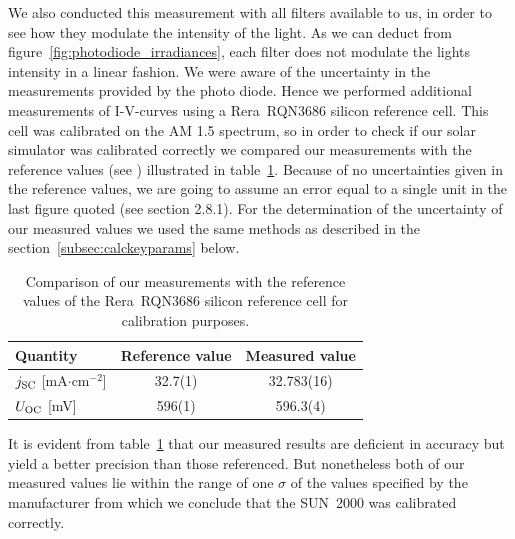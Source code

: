 We also conducted this measurement with all filters available to us, in order to see how they modulate the intensity of the light. As we can deduct from figure~\ref{fig:photodiode_irradiances}, each filter does not modulate the lights intensity in a linear fashion.\mypar
We were aware of the uncertainty in the measurements provided by the photo diode. Hence we performed additional measurements of I-V-curves using a Rera~RQN3686 silicon reference cell. This cell was calibrated on the AM 1.5 spectrum, so in order to check if our solar simulator was calibrated correctly we compared our measurements with the reference values (see \cite{reracat}) illustrated in table~\ref{tab:reracomp}. Because of no uncertainties given in the reference values, we are going to assume an error equal to a single unit in the last figure quoted (see \cite{measurements} section 2.8.1). For the determination of the uncertainty of our measured values we used the same methods as described in the section~\ref{subsec:calckeyparams} below.
\begin{table}[h]\centering
\caption{Comparison of our measurements with the reference values of the Rera~RQN3686 silicon reference cell for calibration purposes.}
\label{tab:reracomp}
\begin{tabular}{@{}lcc@{}}\toprule
Quantity & Reference value & Measured value\\ \midrule
$j_{\text{SC}}$ [mA$\cdot$cm$^{-2}$] & 32.7(1) & 32.783(16) \\
$U_{\text{OC}}$ [mV]& 596(1) & 596.3(4) \\ \bottomrule
\end{tabular}
\end{table}

It is evident from table~\ref{tab:reracomp} that our measured results are deficient in accuracy but yield a better precision than those referenced. But nonetheless both of our measured values lie within the range of one $\sigma$ of the values specified by the manufacturer from which we conclude that the SUN~2000 was calibrated correctly.


